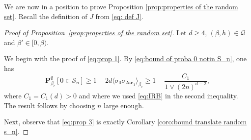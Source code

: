\documentclass[11pt,a4paper]{article}
\numberwithin{equation}{section}
\theoremstyle{plain}
\theoremstyle{definition}
\newcommand\fg{\mathfrak{g}}
\begin{document}
We are now in a position to prove Proposition \ref{prop:properties of the random set}. Recall the definition of $J$ from \eqref{eq: def J}.
\begin{proof}[Proof of Proposition~\textup{\ref{prop:properties of the random set}}] Let $d\geq 4$, $(\beta,h)\in \mathcal Q$ and $\beta'\in [0,\beta)$.

We begin with the proof of \eqref{eq:prop 1}. By \eqref{eq:bound of proba 0 notin S_n}, one has
\begin{equation}\label{eq:proof of prop 1}
	\mathbf P_{\beta_c}^\emptyset [0\in \mathcal S_n]\geq 1-2d\langle \sigma_0\sigma_{2n\mathbf{e}_1}\rangle_{\beta_c}\geq 1-\frac{C_1}{1\vee (2n)^{d-2}},
\end{equation} 
where $C_1=C_1(d)>0$ and where we used \eqref{eq:IRB} in the second inequality. The result follows by choosing $n$ large enough.

Next, observe that \eqref{eq:prop 3} is exactly Corollary \ref{coro:bound translate random s_n}.
	

\end{proof}
\end{document}
